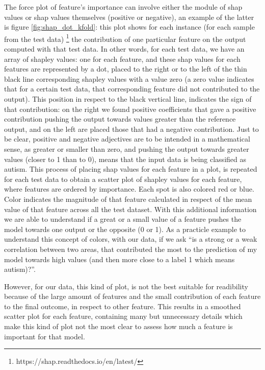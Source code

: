 \documentclass[11pt]{report}
\begin{document}
The force plot of feature's importance can involve either the module of shap values or shap values themselves (positive or negative), an example of the latter is figure \ref{fig:shap_dot_kfold}: this plot shows for each instance (for each sample from the test data)
\footnote{https://shap.readthedocs.io/en/latest/}
the contribution of one particular feature on the output computed with that test data.
In other words, for each test data, we have an array of shapley values: one for each feature, and these shap values for each features are represented by a dot, placed to the right or to the left of the thin black line corresponding shapley values with a value zero (a zero value indicates that for a certain test data, that corresponding feature did not contributed to the output).
This position in respect to the black vertical line, indicates the sign of that contribution: on the right we found positive coefficients that gave a positive contribution pushing the output towards values greater than the reference output, and on the left are placed those that had a negative contribution.
Just to be clear, positive and negative adjectives are to be intended in a mathematical sense, as greater or smaller than zero, and pushing the output towards greater values (closer to 1 than to 0), means that the input data is being classified as autism.
This process of placing shap values for each feature in a plot, is repeated for each test data to obtain a scatter plot of shapley values for each feature, where features are ordered by importance.
Each spot is also colored red or blue. Color indicates the magnitude of that feature calculated in respect of the mean value of that feature across all the test dataset. With this additional information we are able to understand if a great or a small value of a feature pushes the model towards one output or the opposite (0 or 1).
As a practicle example to understand this concept of colors, with our data, if we ask \textquotedblleft is a strong or a weak correlation between two areas, that contributed the most to the prediction of my model towards high values (and then more close to a label 1 which means autism)?\textquotedblright.


However, for our data, this kind of plot, is not the best suitable for readibility because of the large amount of features and the small contribution of each feature to the final outcome, in respect to other feature.
This results in a smoothed scatter plot for each feature, containing many but unnecessary details which make this kind of plot not the most clear to assess how much a feature is important for that model.
\end{document}
